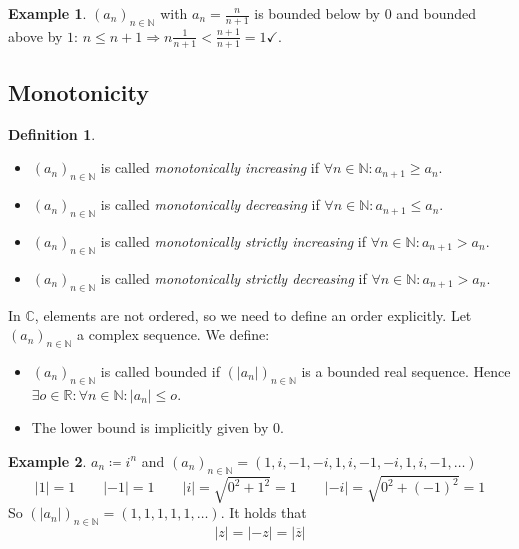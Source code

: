 \documentclass[a4paper,landscape,twocolumn]{article}
\theoremstyle{definition}
\newtheorem{defi}{Definition}
\newtheorem{ex}{Example}
\newcommand\abs[1]{\left|#1\right|}
\begin{document}
\begin{ex}
  $(a_n)_{n \in \mathbb N}$ with $a_n = \frac{n}{n+1}$ is bounded below by $0$
  and bounded above by $1$: $n \leq n+1 \Rightarrow n \frac{1}{n+1} < \frac{n+1}{n+1} = 1 \checkmark$.
\end{ex}

\subsection{Monotonicity}
\begin{defi}\hfill{}
  \begin{itemize}
    \item $(a_n)_{n \in \mathbb N}$ is called \emph{monotonically increasing} if $\forall n \in \mathbb N: a_{n+1} \geq a_n$.
    \item $(a_n)_{n \in \mathbb N}$ is called \emph{monotonically decreasing} if $\forall n \in \mathbb N: a_{n+1} \leq a_n$.
    \item $(a_n)_{n \in \mathbb N}$ is called \emph{monotonically strictly increasing} if $\forall n \in \mathbb N: a_{n+1} > a_n$.
    \item $(a_n)_{n \in \mathbb N}$ is called \emph{monotonically strictly decreasing} if $\forall n \in \mathbb N: a_{n+1} > a_n$.
  \end{itemize}
  In $\mathbb C$, elements are not ordered, so we need to define an order explicitly.
  Let $(a_n)_{n \in \mathbb N}$ a complex sequence. We define:
  \begin{itemize}
    \item $(a_n)_{n \in \mathbb N}$ is called bounded if $(\abs{a_n})_{n \in \mathbb N}$ is a bounded real sequence.
    Hence $\exists o \in \mathbb R: \forall n \in \mathbb N: \abs{a_n} \leq o$.
    \item The lower bound is implicitly given by $0$.
  \end{itemize}
\end{defi}

\begin{ex}
  $a_n \coloneqq i^n$ and $(a_n)_{n \in \mathbb N} = (1, i, -1, -i, 1, i, -1, -i, 1, i, -1, \dots)$
  \[ \abs{1} = 1 \qquad \abs{-1} = 1 \qquad \abs{i} = \sqrt{0^2 + 1^2} = 1 \qquad \abs{-i} = \sqrt{0^2 + (-1)^2} = 1 \]
  So $\left(\abs{a_n}\right)_{n \in \mathbb N} = (1, 1, 1, 1, 1, \dots)$.
  It holds that
  \[ \abs{z} = \abs{-z} = \abs{\overline{z}} \]
\end{ex}
\end{document}
